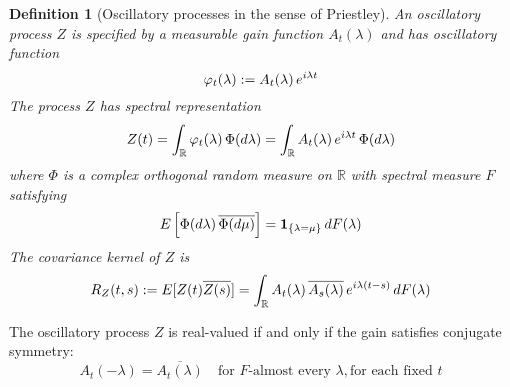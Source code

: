 \documentclass{article}
\newcommand{\assign}{:=}
\newtheorem{definition}{Definition}
{\theorembodyfont{\rmfamily}\newtheorem{remark}{Remark}}
\begin{document}
\begin{definition}
  [Oscillatory processes in the sense of Priestley] An oscillatory process $Z$ is specified by a measurable gain function $A_t(\lambda)$ and has oscillatory function
  \begin{equation}
    \varphi_t(\lambda) \assign A_t(\lambda) \hspace{0.17em} e^{i \lambda t}
  \end{equation}
  The process $Z$ has spectral representation
  \begin{equation}
    Z(t) = \int_{\mathbb{R}} \varphi_t(\lambda) \hspace{0.17em} \Phi(d\lambda) = \int_{\mathbb{R}} A_t(\lambda) \hspace{0.17em} e^{i \lambda t} \hspace{0.17em} \Phi(d\lambda)
  \end{equation}
  where $\Phi$ is a complex orthogonal random measure on $\mathbb{R}$ with spectral measure $F$ satisfying
  \begin{equation}
    E\left[\Phi(d\lambda) \hspace{0.17em} \overline{\Phi(d\mu)}\right] = \mathbf{1}_{\{\lambda = \mu\}} \hspace{0.17em} dF(\lambda)
  \end{equation}
  The covariance kernel of $Z$ is
  \begin{equation}
    R_Z(t,s) \assign E[Z(t)\overline{Z(s)}] = \int_{\mathbb{R}} A_t(\lambda) \hspace{0.17em} \overline{A_s(\lambda)} \hspace{0.17em} e^{i\lambda(t-s)} \hspace{0.17em} dF(\lambda)
  \end{equation}
\end{definition}

\begin{remark}
   The oscillatory process $Z$ is real-valued if and only if the gain satisfies conjugate symmetry:
  \begin{equation}
    A_t(-\lambda) = \overline{A_t(\lambda)} \quad \text{for $F$-almost every } \lambda, \text{for each fixed } t
  \end{equation}
\end{remark}
\end{document}

